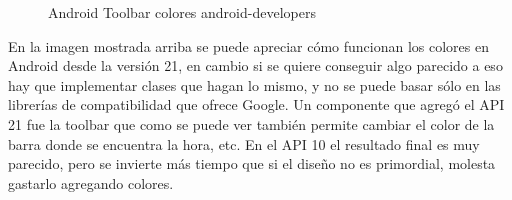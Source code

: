 \begin{figure}[H] 
  \begin{center} 
    \caption{Android Toolbar colores android-developers} 
    \label{fig:AndroidToolbar} 
  \end{center} 
\end{figure}

En la imagen mostrada arriba se puede apreciar cómo funcionan los colores en Android desde la versión 21, en cambio si se quiere conseguir algo parecido a eso hay que implementar clases que hagan lo mismo, y no se puede basar sólo en las librerías de compatibilidad que ofrece Google.
Un componente que agregó el API 21 fue la toolbar que como se puede ver también permite cambiar el color de la barra donde se encuentra la hora, etc.
En el API 10 el resultado final es muy parecido, pero se invierte más tiempo que si el diseño no es primordial, molesta gastarlo agregando colores.

